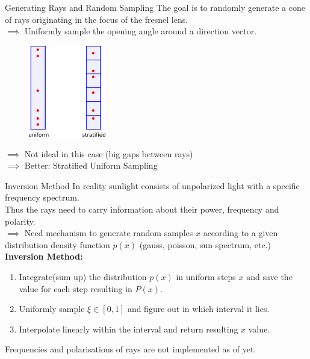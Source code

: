 \documentclass[aspectratio=43,t]{beamer}
\begin{document}
    
    \begin{frame}[fragile]{Generating Rays and Random Sampling}
		The goal is to randomly generate a cone of rays originating in the focus
		of the fresnel lens.\\
		\bigskip
		$\implies$ Uniformly sample the opening angle around a direction vector.

		\begin{figure}
		\centering
		\includegraphics[width=0.3\textwidth]{images/stratified.png}
		\end{figure}

		\bigskip
		$\implies$ Not ideal in this case (big gaps between rays)\\
		$\implies$ Better: Stratified Uniform Sampling
		\end{frame}

		\begin{frame}[fragile]{Inversion Method}
		In reality sunlight consists of unpolarized light with a specific frequency spectrum.\\
		Thus the rays need to carry information about their power, frequency and polarity.\\
		\bigskip
		$\implies$ Need mechanism to generate random samples $x$ according to 
			a given distribution density function $p(x)$ (gauss, poisson, sun spectrum, etc.)\\
		\bigskip
			\textbf{Inversion Method:}\\
      \begin{enumerate}
				\item<2-> Integrate(sum up) the distribution $p(x)$ in uniform steps $x$ and save
					the value for each step resulting in $P(x)$.
				\item<3-> Uniformly sample $\xi \in [0,1]$ and figure out in which interval it lies.
        \item<4-> Interpolate linearly within the interval and return resulting $x$ value.
      \end{enumerate}

		\bigskip
		\bigskip
		Frequencies and polarisations of rays are not implemented as of yet.
    \end{frame}
\end{document}
